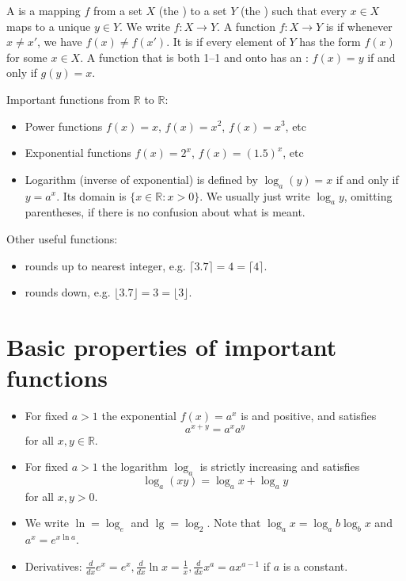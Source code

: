 A  is a mapping $f$ from a set $X$ (the ) to a set $Y$ (the ) such that every $x\in X$ maps to a unique $y\in Y$. We write $f:X\to Y$. A function $f:X\to Y$ is  if whenever $x\neq x'$, we have $f(x) \neq f(x')$. It is  if every element of $Y$ has the form $f(x)$ for some $x\in X$. A function that is both 1--1 and onto has an : $f(x) = y$ if and only if $g(y) = x$. 

Important functions from $\mathbb{R}$ to $\mathbb{R}$: 
\begin{itemize}
\item Power functions $f(x) = x$, $f(x) = x^2$, $f(x) = x^3$, etc
\item Exponential functions $f(x) = 2^x$, $f(x) = (1.5)^x$, etc
\item Logarithm (inverse of exponential) is defined by $\log_a (y) = x$ if and only if $y = a^x$. Its domain is $\{x\in \mathbb{R} : x > 0\}$. We usually just write $\log_a y$, omitting parentheses, if there is no confusion about what is meant.
\end{itemize}

Other useful functions: 
\begin{itemize}
\item {} rounds up to nearest integer, e.g. $\lceil 3.7 \rceil = 4 = \lceil 4 \rceil$. 
\item {} rounds down, e.g. $\lfloor 3.7 \rfloor= 3 = \lfloor 3 \rfloor$.
\end{itemize}


\section{Basic properties of important functions}
\begin{itemize}
\item For fixed $a>1$ the exponential $f(x) = a^x$ is  and positive, and satisfies $$a^{x+y} = a^x a^y$$ for all $x,y\in \mathbb{R}$. 
\item For fixed $a>1$ the logarithm $\log_a$ is strictly increasing and satisfies 
$$\log_a(xy) = \log_a x + \log_a y$$ for all $x,y>0$.
\item We write $\ln = \log_e$ and $\lg = \log_2$. Note that $\log_a x = \log_a b \log_b x$ and $a^x = e^{x\ln a}$.
\item Derivatives: $\frac{d}{dx} e^x = e^x, \frac{d}{dx} \ln x = \frac{1}{x},  \frac{d}{dx} x^a = ax^{a-1}$ if $a$ is a constant.
\end{itemize}



